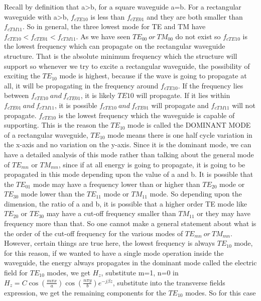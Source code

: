 	Recall by definition that a>b, for a square waveguide a=b. For a rectangular waveguide with a>b, $f_{cTE{10}}$ is less than $f_{cTE{01}}$ and they are both smaller than $f_{cTM{11}}$. So in general, the three lowest mode for TE and TM have $f_{cTE{10}}<f_{cTE{01}}<f_{cTM{11}}$. As we have seen $TE_{00}\ or\ TM_{00}$ do not exist so $f_{cTE{10}}$ is the lowest frequency which can propagate on the rectangular waveguide structure. That is the absolute minimum frequency which the structure will support so whenever we try to excite a rectangular waveguide, the possibility of exciting the $TE_{10}$ mode is highest, because if the wave is going to propagate at all, it will be propagating in the frequency around $f_{cTE{10}}$. If the frequency lies between $f_{cTE{10}}\ and\ f_{cTE{01}}$, it is likely $TE{10}$ will propagate. If it lies within $f_{cTE{01}}\ and\ f_{cTM{11}}$, it is possible $f_{cTE{10}}\ and\ f_{cTE{01}}$ will propagate and $f_{cTM{11}}$ will not propagate. $f_{cTE{10}}$ is the lowest frequency which the waveguide is capable of supporting. This is the reason the $TE_{10}$ mode is called the DOMINANT MODE of a rectangular waveguide, $TE_{10}$ mode means there is one half cycle variation in the x-axis and no variation on the y-axis. Since it is the dominant mode, we can have a detailed analysis of this mode rather than talking about the general mode of $TE_{mn}$ or $TM_{mn}$, since if at all energy is going to propagate, it is going to be propagated in this mode depending upon the value of a and b. It is possible that the $TE_{01}$ mode may have a frequency lower than or higher than $TE_{20}$ mode or $TE_{30}$ mode lower than the $TE_{11}$ mode or $TM_{11}$ mode. So depending upon the dimension, the ratio of a and b, it is possible that a higher order TE mode like $TE_{20}$ or $TE_{30}$ may have a cut-off frequency smaller than $TM_{11}$ or they may have frequency more than that. So one cannot make a general statement about what is the order of the cut-off frequency for the various modes of $TE_{mn}\ or\ TM_{mn}$. However, certain things are true here, the lowest frequency is always $TE_{10}$ mode, for this reason, if we wanted to have a single mode operation inside the waveguide, the energy always propagates in the dominant mode called the electric field for $TE_{10}$ modes, we get $H_z$, substitute m=1, n=0 in $H_z = C \cos (\frac{m\pi x}{a})\cos(\frac{n\pi y}{b})e^{-j\beta z}$, substitute into the transverse fields expression, we get the remaining components for the $TE_{10}$ modes. So for this case
